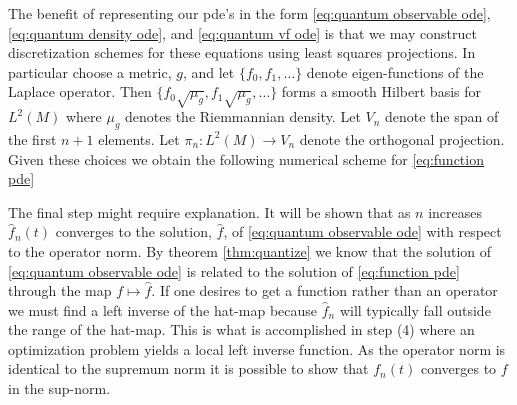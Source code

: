 \documentclass[12pt]{amsart}
\begin{document}
The benefit of representing our pde's in the form \eqref{eq:quantum observable ode},\eqref{eq:quantum density ode}, and \eqref{eq:quantum vf ode}
is that we may construct discretization schemes for these equations using least squares projections.
In particular choose a metric, $g$, and let $\{ f_{0}, f_{1},\dots \}$ denote  eigen-functions of the Laplace operator.
Then $\{ f_{0} \sqrt{\mu_{g}} , f_{1} \sqrt{\mu_{g}} , \dots \}$ forms a smooth Hilbert basis for $L^{2}(M)$ where $\mu_{g}$ denotes the Riemmannian density.
Let $V_{n}$ denote the span of the first $n+1$ elements.
Let $\pi_{n}:L^{2}(M) \to V_{n}$ denote the orthogonal projection. 
Given these choices we obtain the following numerical scheme for \eqref{eq:function pde}

\begin{center}
\end{center}

The final step might require explanation.
It will be shown that as $n$ increases $\hat{f}_{n}(t)$ converges to the solution, $\hat{f}$, of \eqref{eq:quantum observable ode} with respect to the operator norm.
By theorem \eqref{thm:quantize} we know that the solution of \eqref{eq:quantum observable ode} is related to the solution of \eqref{eq:function pde}
through the map $f \mapsto \hat{f}$.
If one desires to get a function rather than an operator we must find a left inverse of the hat-map because $\hat{f}_{n}$ will typically fall outside the range of the hat-map.
This is what is accomplished in step (4) where an optimization problem yields a local left inverse function.
As the operator norm is identical to the supremum norm it is possible to show that $f_{n}(t)$ converges to $f$ in the sup-norm.
\end{document}
